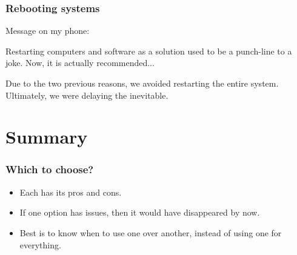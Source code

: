\documentclass[11pt,aspectratio=43,ignorenonframetext,t]{beamer}
\begin{document}
\begin{frame}

\frametitle{Rebooting systems}

Message on my phone:
\begin{figure}
  \centering
  {}
\end{figure}
\vs

Restarting computers and software as a solution used to be a punch-line to a joke.  Now, it is actually recommended...
\vs

Due to the two previous reasons, we avoided restarting the entire system.  Ultimately, we were delaying the inevitable.

\end{frame}


\section{Summary}


\begin{frame}

\frametitle{Which to choose?}

\begin{itemize}
  \item Each has its pros and cons.
  \item If one option has issues, then it would have disappeared by now.
  \item Best is to know when to use one over another, instead of using one for everything.
\end{itemize}

\end{frame}
\end{document}
